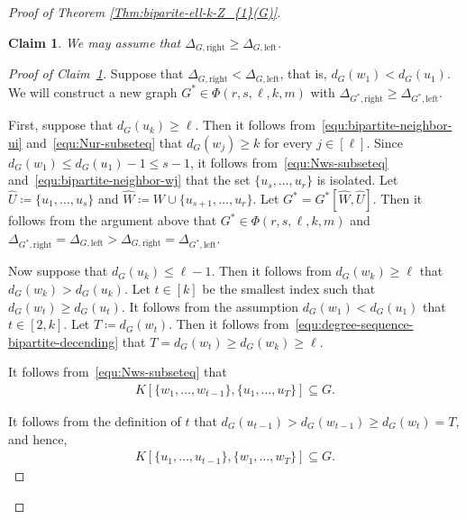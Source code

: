 \documentclass[11pt,a4paper]{article}
\newtheorem{claim}[definition]{Claim}
\begin{document}
\begin{proof}[Proof of Theorem \ref{Thm:biparite-ell-k-Z_{1}(G)}]
    \begin{claim}\label{CLAIM:dw1>=du1}
        We may assume that $\Delta_{G, \mathrm{right}} \ge \Delta_{G, \mathrm{left}}$.  
    \end{claim}
    \begin{proof}[Proof of Claim~\ref{CLAIM:dw1>=du1}]
        Suppose that $\Delta_{G, \mathrm{right}} < \Delta_{G, \mathrm{left}}$, that is, $d_{G}(w_1) < d_{G}(u_1)$.  
        We will construct a new graph $G^{\ast} \in \Phi(r,s,\ell,k,m)$ with $\Delta_{G^{\ast}, \mathrm{right}} \ge \Delta_{G^{\ast}, \mathrm{left}}$. 

        First, suppose that $d_{G}(u_{k}) \ge \ell$. Then it follows from~\eqref{equ:bipartite-neighbor-ui} and~\eqref{equ:Nur-subseteq} that $d_{G}(w_j) \ge k$ for every $j \in [\ell]$. 
        Since $d_{G}(w_1) \le d_{G}(u_1) - 1 \le s - 1$, it follows from~\eqref{equ:Nws-subseteq} and~\eqref{equ:bipartite-neighbor-wj} that the set $\{u_s, \ldots, u_{r}\}$ is isolated. 
        Let $\hat{U} \coloneqq \{u_1, \ldots, u_{s}\}$ and $\hat{W} \coloneqq W \cup \{u_{s+1}, \ldots, u_{r}\}$. 
        Let $G^{\ast} = G^{\ast}[\hat{W}, \hat{U}]$. 
        Then it follows from the argument above that $G^{\ast} \in \Phi(r,s,\ell,k,m)$ and $\Delta_{G^{\ast}, \mathrm{right}} = \Delta_{G, \mathrm{left}} > \Delta_{G, \mathrm{right}} = \Delta_{G^{\ast}, \mathrm{left}}$. 

        Now suppose that $d_{G}(u_{k}) \le \ell - 1$.
        Then it follows from $d_{G}(w_{k}) \ge \ell$ that $d_{G}(w_{k}) > d_{G}(u_{k})$. 
        Let $t \in [k]$ be the smallest index such that $d_{G}(w_t) \ge d_{G}(u_t)$. 
        It follows from the assumption $d_{G}(w_1) < d_{G}(u_1)$ that $t \in [2,k]$. 
        Let $T \coloneqq d_{G}(w_t)$. 
        Then it follows from~\eqref{equ:degree-sequence-bipartite-decending} that $T = d_{G}(w_t) \ge d_{G}(w_{k}) \ge \ell$. 

        It follows from~\eqref{equ:Nws-subseteq} that 
        \begin{align*}
            K[\{w_1, \ldots, w_{t-1}\}, \{u_1,\ldots,u_{T}\}]
            \subseteq G. 
        \end{align*}

        It follows from the definition of $t$ that $d_{G}(u_{t-1}) > d_{G}(w_{t-1}) \ge d_{G}(w_{t}) = T$, and hence, 
        \begin{align*}
            K[\{u_1, \ldots, u_{t-1}\}, \{w_1, \ldots, w_{T}\}]
            \subseteq G. 
        \end{align*}


\end{proof}
\end{proof}
\end{document}
